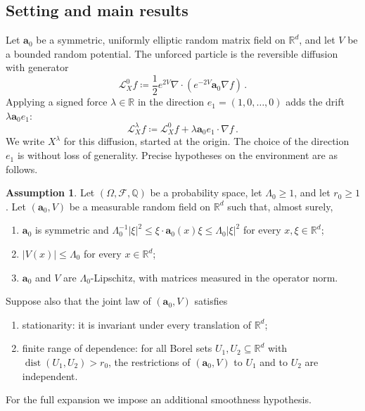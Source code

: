 \documentclass[11pt]{amsart}
\theoremstyle{definition}
\newtheorem{assumption}{Assumption}[section]
\theoremstyle{remark}
\numberwithin{equation}{section}
\newcommand{\Q}{\mathbb Q}
\newcommand{\R}{\mathbb R}
\renewcommand{\a}{\mathbf a}
\begin{document}
\subsection{Setting and main results}\label{ss.setting}

Let $\a_0$ be a symmetric, uniformly elliptic random matrix field on $\R^d$, and let $V$ be a bounded random potential. The unforced particle is the reversible diffusion with generator
\begin{equation}\label{eq.physical-generator}
 \mathcal L_X^0f\coloneqq\frac12e^{2V}\nabla\cdot(e^{-2V}\a_0\nabla f)\, .
\end{equation}
Applying a signed force $\lambda\in\R$ in the direction $e_1=(1,0,\ldots,0)$ adds the drift $\lambda\a_0e_1$:
\begin{equation}\label{eq.physical-tilt}
 \mathcal L_X^\lambda f\coloneqq\mathcal L_X^0f+\lambda\a_0e_1\cdot\nabla f\, .
\end{equation}
We write $X^\lambda$ for this diffusion, started at the origin. The choice of the direction $e_1$ is without loss of generality. Precise hypotheses on the environment are as follows.

\begin{assumption}\label{a.environment}
Let $(\Omega,\mathcal F,\Q)$ be a probability space, let $\Lambda_0\geq1$, and let $r_0\geq1$. Let $(\a_0,V)$ be a measurable random field on $\R^d$ such that, almost surely,
\begin{enumerate}
\item[(S1)] $\a_0$ is symmetric and $\Lambda_0^{-1}|\xi|^2\leq\xi\cdot\a_0(x)\xi\leq\Lambda_0|\xi|^2$ for every $x,\xi\in\R^d$;
\item[(S2)] $|V(x)|\leq\Lambda_0$ for every $x\in\R^d$;
\item[(S3)] $\a_0$ and $V$ are $\Lambda_0$-Lipschitz, with matrices measured in the operator norm.
\end{enumerate}
Suppose also that the joint law of $(\a_0,V)$ satisfies
\begin{enumerate}
\item[(S4)] stationarity: it is invariant under every translation of $\R^d$;
\item[(S5)] finite range of dependence: for all Borel sets $U_1,U_2\subseteq\R^d$ with $\operatorname{dist}(U_1,U_2)>r_0$, the restrictions of $(\a_0,V)$ to $U_1$ and to $U_2$ are independent.
\end{enumerate}
\end{assumption}

For the full expansion we impose an additional smoothness hypothesis.
\end{document}
